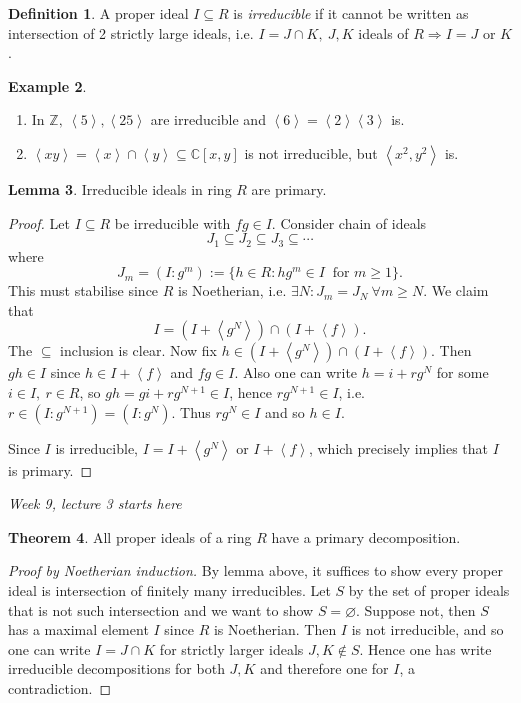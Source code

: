 \documentclass[a4paper]{article}
\newcommand{\la}{\left\langle}
\newcommand{\ra}{\right\rangle}
\newcommand{\Z}{\mathbb Z}
\newcommand{\C}{\mathbb C}
\theoremstyle{definition}
\newtheorem{defn}{Definition}[subsection]
\newtheorem{thm}[defn]{Theorem}
\newtheorem{lemma}[defn]{Lemma}
\newtheorem{example}[defn]{Example}
\begin{document}
\begin{defn}
A proper ideal $I\subseteq R$ is \textit{irreducible} if it cannot be written as intersection of 2 strictly large ideals, i.e. $I=J\cap K,\ J,K$ ideals of $R \Rightarrow I=J$ or $K$.
\end{defn}

\begin{example}
\begin{enumerate}
\item In $\Z,\ \la 5\ra,\la 25\ra$ are irreducible and $\la 6\ra=\la 2\ra\la 3\ra$ is.
\item $\la xy\ra=\la x\ra\cap\la y\ra\subseteq\C[x,y]$ is not irreducible, but $\la x^2,y^2\ra$ is.
\end{enumerate}
\end{example}

\begin{lemma}
Irreducible ideals in ring $R$ are primary.
\end{lemma}
\begin{proof}
Let $I\subseteq R$ be irreducible with $fg\in I$. Consider chain of ideals
\[
J_1\subseteq J_2\subseteq J_3\subseteq \cdots
\]
where
\[
J_m=(I:g^m):=\{h\in R:hg^m\in I \ \text{ for }m\geq 1\}.
\]
This must stabilise since $R$ is Noetherian, i.e. $\exists N:J_m=J_N \ \forall m\geq N$. We claim that
\[
I=\left(I+\la g^N\ra\right)\cap (I+\la f\ra).
\]
The $\subseteq$ inclusion is clear. Now fix $h\in\left(I+\la g^N\ra\right)\cap (I+\la f\ra)$. Then $gh\in I$ since $h\in I+\la f\ra$ and $fg\in I$. Also one can write $h=i+rg^N$ for some $i\in I,\ r\in R$, so $gh=gi+rg^{N+1} \in I$, hence $rg^{N+1}\in I$, i.e. $r\in (I:g^{N+1})=(I:g^N)$. Thus $rg^N\in I$ and so $h\in I$.

Since $I$ is irreducible, $I=I+\la g^N\ra$ or $I+\la f\ra$, which precisely implies that $I$ is primary.
\end{proof}

\begin{flushright}
\textit{Week 9, lecture 3 starts here}
\end{flushright}

\begin{thm}
All proper ideals of a ring $R$ have a primary decomposition.
\end{thm}
\begin{proof}[Proof by Noetherian induction]
By lemma above, it suffices to show every proper ideal is intersection of finitely many irreducibles. Let $S$ by the set of proper ideals that is not such intersection and we want to show $S=\varnothing$. Suppose not, then $S$ has a maximal element $I$ since $R$ is Noetherian. Then $I$ is not irreducible, and so one can write $I=J\cap K$ for strictly larger ideals $J,K\notin S$. Hence one has write irreducible decompositions for both $J,K$ and therefore one for $I$, a contradiction.
\end{proof}
\end{document}
